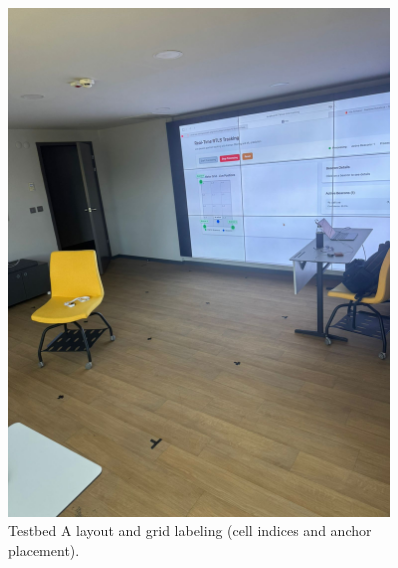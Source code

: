 \documentclass[a4paper,12pt]{report}
\begin{document}
\begin{figure}[H]
    \centering
    \includegraphics[width=0.9\textwidth]{figures/layout_grid_testbedA.png}
    \caption{Testbed A layout and grid labeling (cell indices and anchor placement).}
    \label{fig:testbedA_layout}
\end{figure}
\end{document}
